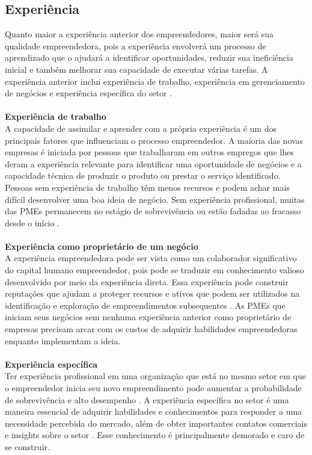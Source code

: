\subsection{Experiência}
\label{subsec:framing}

Quanto maior a experiência anterior dos empreendedores, maior será sua qualidade empreendedora, pois a experiência envolverá um processo de aprendizado que o ajudará a identificar oportunidades, reduzir sua ineficiência inicial e também melhorar sua capacidade de executar várias tarefas. A experiência anterior inclui experiência de trabalho, experiência em gerenciamento de negócios e experiência específica do setor \cite{thandekaruthkunene2008}.
\\
\\
\textbf{Experiência de trabalho}
\\

A capacidade de assimilar e aprender com a própria experiência é um dos principais fatores que influenciam o processo empreendedor. A maioria das novas empresas é iniciada por pessoas que trabalharam em outros empregos que lhes deram a experiência relevante para identificar uma oportunidade de negócios e a capacidade técnica de produzir o produto ou prestar o serviço identificado. Pessoas sem experiência de trabalho têm menos recursos e podem achar mais difícil desenvolver uma boa ideia de negócio. Sem experiência profissional, muitas das PMEs permanecem no estágio de sobrevivência ou estão fadadas ao fracasso desde o início \cite{thandekaruthkunene2008}.
\\
\\
\textbf{Experiência como proprietário de um negócio}
\\

A experiência empreendedora pode ser vista como um colaborador significativo do capital humano empreendedor, pois pode se traduzir em conhecimento valioso desenvolvido por meio da experiência direta. Essa experiência pode construir reputações que ajudam a proteger recursos e ativos que podem ser utilizados na identificação e exploração de empreendimentos subsequentes \cite{guzmanj.&santosf.j.2001}. As PMEs que iniciam seus negócios sem nenhuma experiência anterior como proprietário de empresas precisam arcar com os custos de adquirir habilidades empreendedoras enquanto implementam a ideia.
\\
\\
\textbf{Experiência específica}
\\

Ter experiência profissional em uma organização que está no mesmo setor em que o empreendedor inicia seu novo empreendimento pode aumentar a probabilidade de sobrevivência e alto desempenho \cite{Dahlqvist2000}. A experiência específica no setor é uma maneira essencial de adquirir habilidades e conhecimentos para responder a uma necessidade percebida do mercado, além de obter importantes contatos comerciais e insights sobre o setor \cite{guzmanj.&santosf.j.2001}. Esse conhecimento é principalmente demorado e caro de se construir.

